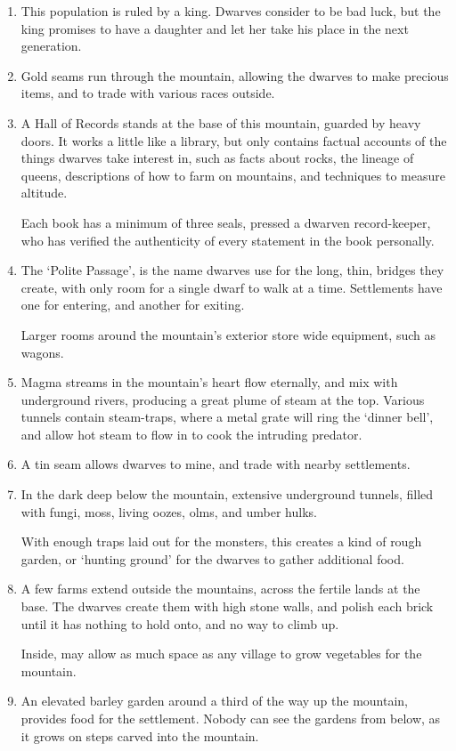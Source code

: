 \begin{multicols}{2}
\begin{enumerate}
  \item
  This population is ruled by a king.
  Dwarves consider to be bad luck, but the king promises to have a daughter and let her take his place in the next generation.
  \item
  Gold seams run through the mountain, allowing the dwarves to make precious items, and to trade with various races outside.
  \item
  A Hall of Records stands at the base of this mountain, guarded by heavy doors.
  It works a little like a library, but only contains factual accounts of the things dwarves take interest in, such as facts about rocks, the lineage of queens, descriptions of how to farm on mountains, and techniques to measure altitude.

  Each book has a minimum of three seals, pressed a dwarven record-keeper, who has verified the authenticity of every statement in the book personally.
  \item
  The `Polite Passage', is the name dwarves use for the long, thin, bridges they create, with only room for a single dwarf to walk at a time.
  Settlements have one for entering, and another for exiting.

  Larger rooms around the mountain's exterior store wide equipment, such as wagons.
  \item
  Magma streams in the mountain's heart flow eternally, and mix with underground rivers, producing a great plume of steam at the top.
  Various tunnels contain steam-traps, where a metal grate will ring the `dinner bell', and allow hot steam to flow in to cook the intruding predator.
  \item
  A tin seam allows dwarves to mine, and trade with nearby settlements.
  \item
  In the dark \gls{deep} below the mountain, extensive underground tunnels, filled with fungi, moss, living oozes, olms, and umber hulks.

  With enough traps laid out for the monsters, this creates a kind of rough garden, or `hunting ground' for the dwarves to gather additional food.
  \item
  A few farms extend outside the mountains, across the fertile lands at the base.
  The dwarves create them with high stone walls, and polish each brick until it has nothing to hold onto, and no way to climb up.

  Inside, may allow as much space as any \gls{village} to grow vegetables for the mountain.
  \item
  An elevated barley garden around a third of the way up the mountain, provides food for the settlement.
  Nobody can see the gardens from below, as it grows on steps carved into the mountain.


\end{enumerate}
\end{multicols}

